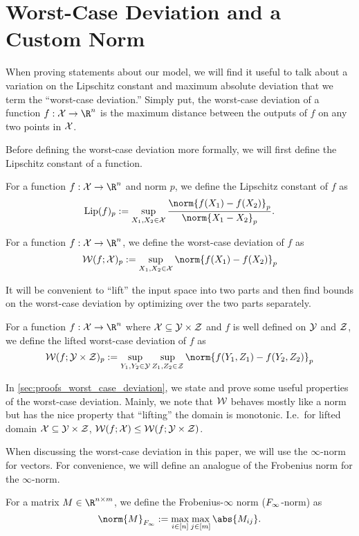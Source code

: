 \section{Worst-Case Deviation and a Custom Norm}
\label{sec:worst_case_framework}
When proving statements about our model, we will find it useful to talk about a variation on the Lipschitz constant and maximum absolute deviation that we term the ``worst-case deviation.''
Simply put, the worst-case deviation of a function $f: \calX \to \R^n$ is the maximum distance between the outputs of $f$ on any two points in $\mathcal{X}$.

Before defining the worst-case deviation more formally, we will first define the Lipschitz constant of a function.
\begin{definition}
	\label{def:lipschitz_constant}
	For a function $f: \calX \to \R^n$ and norm $p$, we define the Lipschitz constant of $f$ as
	\[
		\Lip(f)_p := \sup_{X_1, X_2 \in \calX} \frac{\norm{f(X_1) - f(X_2)}_p}{\norm{X_1 - X_2}_p}.
	\]
\end{definition}

\begin{definition}
	\label{def:worst_case_deviation}
	For a function $f: \mathcal{X} \to \R^n$, we define the worst-case deviation of $f$ as
	\[
		\WD(f; \calX)_p := \sup_{X_1, X_2 \in \calX} \norm{f(X_1) - f(X_2)}_p
	\]
\end{definition}

It will be convenient to ``lift'' the input space into two parts and then find bounds on the worst-case deviation by optimizing over the two parts separately.
\begin{definition}
	\label{def:lifted_worst_case_deviation}
	For a function $f: \mathcal{X} \to \R^n$ where $\mathcal{X} \subseteq \mathcal{Y} \times \mathcal{Z}$ and $f$ is well defined on $\mathcal{Y}$ and $\mathcal{Z}$, we define the lifted worst-case deviation of $f$ as
	\[
		\WD(f; \calY \times \calZ)_p := \sup_{Y_1, Y_2 \in \calY} \sup_{Z_1, Z_2 \in \calZ} \norm{f(Y_1, Z_1) - f(Y_2, Z_2)}_p
	\]
\end{definition}

In \cref{sec:proofs_worst_case_deviation}, we state and prove some useful properties of the worst-case deviation.
Mainly, we note that $\mathcal{W}$ behaves mostly like a norm but has the nice property that ``lifting'' the domain is monotonic.
I.e.\ for lifted domain $\mathcal{X} \subseteq \mathcal{Y} \times \mathcal{Z}$, $\mathcal{W}(f; \mathcal{X}) \leq \mathcal{W}(f; \mathcal{Y} \times \mathcal{Z})$.

When discussing the worst-case deviation in this paper, we will use the $\infty$-norm for vectors.
For convenience, we will define an analogue of the Frobenius norm for the $\infty$-norm.

\begin{definition}
	\label{def:frobenius_infinity_norm}
	For a matrix $M \in \R^{n \times m}$, we define the Frobenius-$\infty$ norm (${F_{\infty}}$-norm) as
	\[
		\norm{M}_{\frobInf} := \max_{i \in [n]} \max_{j \in [m]} \abs{M_{ij}}.
	\]
\end{definition}

